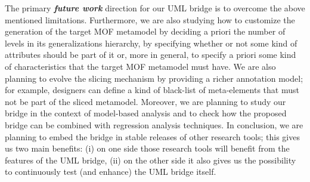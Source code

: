 The primary \textbf{\textit{future work}} direction for our UML bridge is to overcome the above mentioned limitations.
Furthermore, we are also studying how to customize the generation of the target MOF metamodel by deciding a priori the number of levels in its generalizations hierarchy, by specifying whether or not some kind of attributes should be part of it or, more in general, to specify a priori some kind of characteristics that
the target MOF metamodel must have. 
We are also planning to evolve the slicing mechanism by providing a richer annotation model; for example,
designers can define a kind of black-list of meta-elements that must not be part of the sliced metamodel. 
Moreover, we are planning to study our bridge in the context of model-based analysis and to check
how the proposed bridge can be combined with regression analysis techniques.
In conclusion, we are planning to embed the bridge in stable releases of other research tools; this gives us two main benefits:
(i) on one side those research tools will benefit from the features of the UML bridge, 
(ii) on the other side it also gives us the possibility to continuously test (and enhance) the UML bridge itself.


